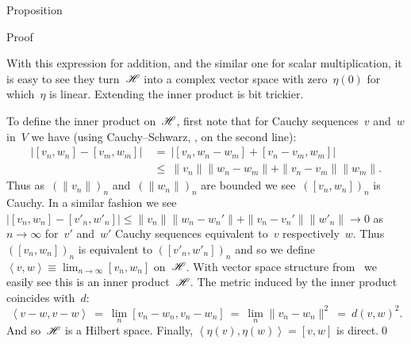 \begin{parsec}
\begin{point}{Proposition}
\begin{point}{Proof}
\begin{point}
With this expression for addition, and the similar one for
    scalar multiplication, it is easy to see
    they turn~$\mathscr{H}$ into a complex vector space with zero~$\eta(0)$
    for which~$\eta$ is linear.
Extending the inner product is bit trickier.
\end{point}
\begin{point}%
To define the inner product on~$\mathscr{H}$,
first note that for Cauchy sequences~$v$ and~$w$ in~$V$
we have (using Cauchy--Schwarz, , on the second line):
\begin{align*}
    \bigl|[v_n,w_n] - [v_m,w_m]\bigr|
    & \ =\  \bigl|[v_n,w_n-w_m] + [v_n - v_m,w_m]\bigr| \\
    & \ \leq\  \|v_n\| \|w_n - w_m\| + \|v_n-v_m\|\|w_m\|.
\end{align*}
Thus as~$(\|v_n\|)_n$ and~$(\|w_n\|)_n$ are bounded
we see~$([v_n,w_n])_n$ is Cauchy.
In a similar fashion we see~$\bigl|[v_n,w_n] - [v'_n,w'_n]\bigr|
    \leq \|v_n\| \|w_n - w_n'\| + \|v_n-v_n'\|\|w'_n\|\to 0$ as~$n\to \infty$
    for~$v'$ and~$w'$ Cauchy sequences equivalent
to~$v$ respectively~$w$.
Thus
$([v_n,w_n])_n$ is equivalent to
$([v'_n,w'_n])_n$
    and so
    we define~$\left<v,w\right>
        \equiv \lim_{n\to \infty} [v_n,w_n]$ on~$\mathscr{H}$.
With vector space structure from~
we easily see this is an inner product~$\mathscr{H}$.
The metric induced by the inner product coincides with~$d$:
\begin{equation*}
    \left<v-w,v-w\right>
   \ =\ \lim_{n}[v_n-w_n,v_n-w_n]
    \ =\ \lim_{n}\|v_n-w_n\|^2
    \ =\  d(v,w)^2.
\end{equation*}
And so~$\mathscr{H}$ is a Hilbert space.
Finally, $\left<\eta(v),\eta(w)\right>=[v,w]$ is direct.\qed
\end{point}
\end{point}
\end{point}
\end{parsec}

